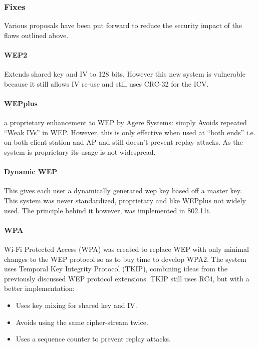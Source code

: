 \documentclass[pdftex, 11pt, a4paper]{article}
\begin{document}
\subsubsection{Fixes}
Various proposals have been put forward to reduce the security impact of the flaws outlined above.

\paragraph{WEP2}
Extends shared key and IV to 128 bits. However this new system is vulnerable because it still allows IV re-use and still uses CRC-32 for the ICV.

\paragraph{WEPplus} a proprietary enhancement to WEP by Agere Systems: simply Avoids repeated ``Weak IVs'' in WEP.  However, this is only effective when used at ``both ends'' i.e.  on both client station and AP and still doesn't prevent replay attacks.  As the system is proprietary its usage is not widespread.

\paragraph{Dynamic WEP}
This gives each user a dynamically generated wep key based off a master key. This system was never standardized, proprietary and like WEPplus not widely used. The principle behind it however, was implemented in 802.11i.

\paragraph{WPA}
Wi-Fi Protected Access (WPA) was created to replace WEP with only minimal changes to the WEP protocol so as to buy time to develop WPA2. The system uses Temporal Key Integrity Protocol (TKIP), combining ideas from the previously discussed WEP protocol extensions. TKIP still uses RC4, but with a better implementation:

\begin{itemize}
\item Uses key mixing for shared key and IV.
\item Avoids using the same cipher-stream twice.
\item Uses a sequence counter to prevent replay attacks.
\end{itemize}
\end{document}
